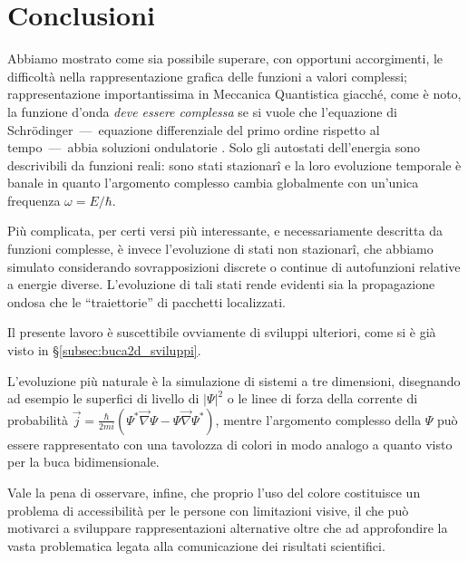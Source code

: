 \chapter{Conclusioni}

Abbiamo mostrato come sia possibile superare, con 
opportuni accorgimenti, le difficoltà nella rappresentazione grafica
delle funzioni a valori complessi; rappresentazione 
importantissima in Meccanica Quantistica giacché, come è noto, 
la funzione d'onda \emph{deve essere complessa} se si vuole che 
l’equazione di Schr\"odinger~---~equazione differenziale del 
primo ordine rispetto al tempo~---~abbia 
soluzioni ondulatorie \cite{MERZBACHER_WAVES}. Solo gli
autostati dell'energia sono descrivibili da funzioni reali: sono stati
stazionar\^{i} e 
la loro evoluzione temporale è banale in quanto l'argomento complesso
cambia globalmente con un'unica frequenza $\omega=E/\hbar$. 

Più complicata, per certi versi più interessante, e necessariamente 
descritta da funzioni complesse, è invece l'evoluzione di stati 
non stazionar\^{i}, che abbiamo
simulato considerando sovrapposizioni discrete o continue
di autofunzioni relative a energie diverse. L’evoluzione di tali stati
rende evidenti sia la propagazione ondosa che le ``traiettorie'' 
di pacchetti localizzati.

Il presente lavoro è suscettibile ovviamente di sviluppi ulteriori,
come si è già visto in \S\ref{subsec:buca2d_sviluppi}. 

L'evoluzione più
naturale è la simulazione di sistemi a tre dimensioni, disegnando
ad esempio le superfici di livello di $|\Psi|^2$ o le linee di forza della
corrente di probabilità $\vec j = \frac{\hbar}{2mi}\left(\Psi^* \vec
\nabla \Psi - \Psi \vec \nabla \Psi^*\right)$, mentre l’argomento
complesso della $\Psi$ può essere rappresentato con una tavolozza di colori
in modo analogo a quanto visto per la buca bidimensionale.

Vale la pena di osservare, infine, che proprio l'uso del colore
costituisce un problema di accessibilità per le
persone con limitazioni visive, il che può motivarci a sviluppare
rappresentazioni alternative oltre che ad approfondire la vasta
problematica legata alla comunicazione dei risultati scientifici.
